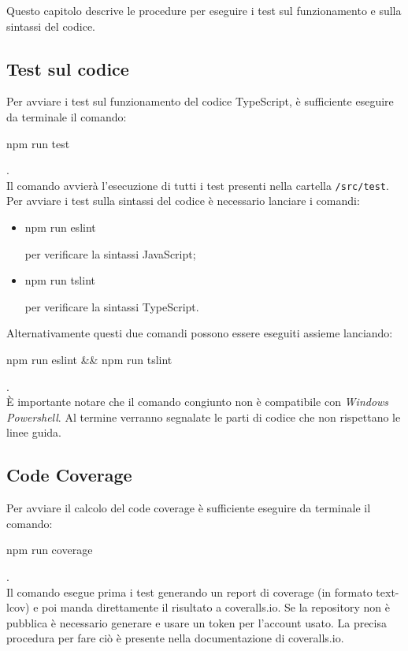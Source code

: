 Questo capitolo descrive le procedure per eseguire i test sul funzionamento e sulla sintassi del codice.
\subsection{Test sul codice}
Per avviare i test sul funzionamento del codice TypeScript, è sufficiente eseguire da terminale il comando:
\\[0.2cm]
\hspace*{10mm}
\begin{ttfamily}
	npm run test
\end{ttfamily}.
\\[0.2cm]
Il comando avvierà l'esecuzione di tutti i test presenti nella cartella \texttt{/src/test}.
Per avviare i test sulla sintassi del codice è necessario lanciare i comandi:
\begin{itemize}
	\item \begin{ttfamily}npm run eslint\end{ttfamily} per verificare la sintassi JavaScript;
	\item \begin{ttfamily}npm run tslint\end{ttfamily}
	per verificare la sintassi TypeScript.
\end{itemize}
Alternativamente questi due comandi possono essere eseguiti assieme lanciando:\\[0.2cm]
\hspace*{10mm}
\begin{ttfamily}
npm run eslint \&\& npm run tslint
\end{ttfamily}.
\\[0.2cm]
È importante notare che il comando congiunto non è compatibile con \emph{Windows Powershell}.
Al termine verranno segnalate le parti di codice che non rispettano le linee guida.

\subsection{Code Coverage}
Per avviare il calcolo del code coverage è sufficiente eseguire da terminale il comando:
\\[0.2cm]
\hspace*{10mm}
\begin{ttfamily}
	npm run coverage
\end{ttfamily}.
\\[0.2cm]
Il comando esegue prima i test generando un report di coverage (in formato text-lcov) e poi manda direttamente il risultato a coveralls.io.
Se la repository non è pubblica è necessario generare e usare un token per l'account usato. La precisa procedura per fare ciò è presente nella documentazione di coveralls.io.
